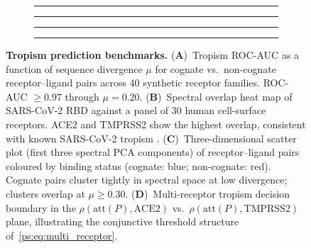\begin{figure}[t]
\centering
\begin{subfigure}[b]{0.23\textwidth}
  \rule{\textwidth}{0.6\textwidth}
  \caption{}
  \label{ps:fig:trop_auc}
\end{subfigure}
\hfill
\begin{subfigure}[b]{0.23\textwidth}
  \rule{\textwidth}{0.6\textwidth}
  \caption{}
  \label{ps:fig:trop_heatmap}
\end{subfigure}
\hfill
\begin{subfigure}[b]{0.23\textwidth}
  \rule{\textwidth}{0.6\textwidth}
  \caption{}
  \label{ps:fig:trop_scatter}
\end{subfigure}
\hfill
\begin{subfigure}[b]{0.23\textwidth}
  \rule{\textwidth}{0.6\textwidth}
  \caption{}
  \label{ps:fig:trop_boundary}
\end{subfigure}
\caption{\textbf{Tropism prediction benchmarks.}
(\textbf{A})~Tropism ROC-AUC as a function of sequence divergence $\mu$ for
cognate vs.\ non-cognate receptor--ligand pairs across 40 synthetic receptor
families. ROC-AUC $\geq 0.97$ through $\mu = 0.20$.
(\textbf{B})~Spectral overlap heat map of SARS-CoV-2 RBD against a panel of
30 human cell-surface receptors. ACE2 and TMPRSS2 show the highest overlap,
consistent with known SARS-CoV-2 tropism \citep{lan2020, hoffmann2020}.
(\textbf{C})~Three-dimensional scatter plot (first three spectral PCA
components) of receptor--ligand pairs coloured by binding status (cognate:
blue; non-cognate: red). Cognate pairs cluster tightly in spectral space at
low divergence; clusters overlap at $\mu \geq 0.30$.
(\textbf{D})~Multi-receptor tropism decision boundary in the
$\rho(\text{att}(P), \text{ACE2})$ vs.\ $\rho(\text{att}(P), \text{TMPRSS2})$
plane, illustrating the conjunctive threshold structure of~\eqref{ps:eq:multi_receptor}.}
\label{ps:fig:tropism}
\end{figure}

